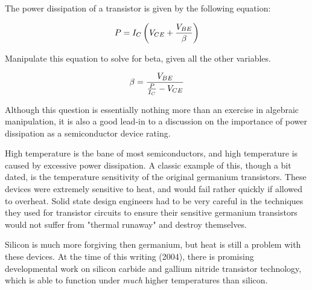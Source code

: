 

The power dissipation of a transistor is given by the following equation:

$$P = I_C \left(V_{CE} + {V_{BE} \over \beta}\right)$$

Manipulate this equation to solve for beta, given all the other variables.







$$\beta = {V_{BE} \over {{P \over I_C} - V_{CE}}}$$







Although this question is essentially nothing more than an exercise in algebraic manipulation, it is also a good lead-in to a discussion on the importance of power dissipation as a semiconductor device rating.

High temperature is the bane of most semiconductors, and high temperature is caused by excessive power dissipation.  A classic example of this, though a bit dated, is the temperature sensitivity of the original germanium transistors.  These devices were extremely sensitive to heat, and would fail rather quickly if allowed to overheat.  Solid state design engineers had to be very careful in the techniques they used for transistor circuits to ensure their sensitive germanium transistors would not suffer from "thermal runaway" and destroy themselves.

Silicon is much more forgiving then germanium, but heat is still a problem with these devices.  At the time of this writing (2004), there is promising developmental work on silicon carbide and gallium nitride transistor technology, which is able to function under {\it much} higher temperatures than silicon.




